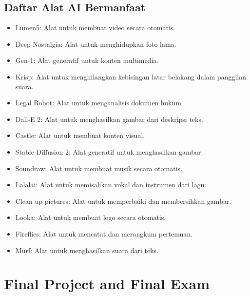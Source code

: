 \documentclass{article}
\begin{document}
\subsection{Daftar Alat AI Bermanfaat}
\begin{itemize}
    \item Lumen5: Alat untuk membuat video secara otomatis.
    \item Deep Nostalgia: Alat untuk menghidupkan foto lama.
    \item Gen-1: Alat generatif untuk konten multimedia.
    \item Krisp: Alat untuk menghilangkan kebisingan latar belakang dalam panggilan suara.
    \item Legal Robot: Alat untuk menganalisis dokumen hukum.
    \item Dall-E 2: Alat untuk menghasilkan gambar dari deskripsi teks.
    \item Castle: Alat untuk membuat konten visual.
    \item Stable Diffusion 2: Alat generatif untuk menghasilkan gambar.
    \item Soundraw: Alat untuk membuat musik secara otomatis.
    \item Lalal\.ai: Alat untuk memisahkan vokal dan instrumen dari lagu.
    \item Clean up pictures: Alat untuk memperbaiki dan membersihkan gambar.
    \item Looka: Alat untuk membuat logo secara otomatis.
    \item Fireflies: Alat untuk mencatat dan merangkum pertemuan.
    \item Murf: Alat untuk menghasilkan suara dari teks.
\end{itemize}





\newpage

\section{Final Project and Final Exam}

\newpage


\end{document}

